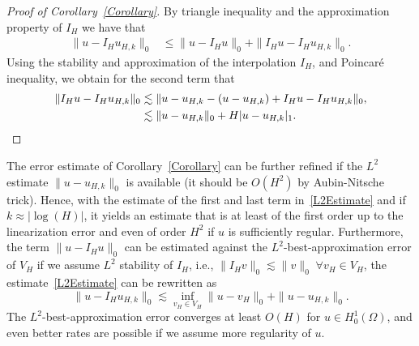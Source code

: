 \documentclass{article}
\begin{document}
 
 \begin{proof}[Proof of Corollary~\ref{Corollary}]
By triangle inequality and the approximation property of $I_H$ we have that
\begin{align*}
    \|u-I_Hu_{H,k}\|_0 &\leq \|u-I_Hu \|_0+\|I_Hu-I_Hu_{H,k}\|_0.
\end{align*}
 Using the stability and approximation of the interpolation $I_H$, and Poincaré inequality, we obtain for the second term that
\begin{align*}
  \|I_Hu-I_Hu_{H,k}\|_0 &\lesssim \|u-u_{H,k}-(u-u_{H,k})+I_Hu-I_Hu_{H,k}\|_0, \\
  &\lesssim \|u-u_{H,k}\|_0+H|u-u_{H,k}|_1. \qedhere
\end{align*}
\end{proof}
The error estimate of Corollary~\ref{Corollary} can be further refined if the $L^2$ estimate $\|u-u_{H,k}\|_0$ is available (it should be $O(H^2)$ by Aubin-Nitsche trick). Hence, with the estimate of the first and last term in~\eqref{L2Estimate} and if $k\approx |\operatorname{log}(H)|$, it yields an estimate that is at least of the first order up to the linearization error and even of order $H^2$ if $u$ is sufficiently regular. 
Furthermore, the term $\|u-I_Hu\|_0$ can be estimated against the $L^2$-best-approximation error of $V_{H}$ if we assume $L^2$ stability of $I_H$, i.e., $\|I_Hv\|_0 \lesssim\|v\|_0 \; \forall v_H \in V_H$, the estimate~\eqref{L2Estimate} can be rewritten as
\[\|u-I_Hu_{H,k}\|_0 \lesssim\inf_{v_H \in V_H}\|u-v_H\|_0+\|u-u_{H,k}\|_0.\]
The $L^2$-best-approximation error converges at least $O(H)$ for $u\in H^1_0(\Omega)$, and even better rates are possible if we assume more regularity of $u$.
 
\end{document}
